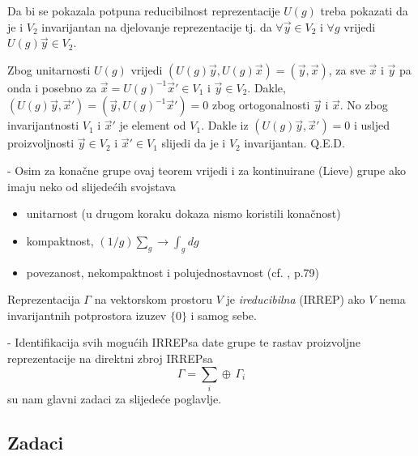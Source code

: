 Da bi se pokazala potpuna reducibilnost
reprezentacije $U(g)$ treba pokazati da  je i $V_2$ invarijantan na djelovanje
reprezentacije tj. da 
$\forall\vec{y} \in V_2$ i $\forall g$ vrijedi $U(g) \vec{y} \in V_2$.

Zbog unitarnosti $U(g)$ vrijedi $(U(g) \vec{y} , U(g)\vec{x}) = 
(\vec{y}, \vec{x})$,
za sve $\vec{x}$ i $\vec{y}$ pa onda i posebno za 
$\vec{x}=U(g)^{-1}\vec{x}'\in V_1$ i
$\vec{y} \in V_2$. Dakle, $(U(g)\vec{y}, \vec{x}')=(\vec{y}, U(g)^{-1}\vec{x}')
=0$ zbog ortogonalnosti $\vec{y}$ i $\vec{x}$.
No zbog invarijantnosti $V_1$ i $\vec{x}'$ je element od $V_1$. Dakle iz
$(U(g) \vec{y} , \vec{x}') = 0$ i usljed proizvoljnosti $\vec{y}\in V_2$
i $\vec{x}'\in V_1$ slijedi da je i $V_2$ invarijantan. Q.E.D.


- Osim za konačne grupe ovaj teorem vrijedi i za kontinuirane (Lieve) grupe
ako imaju neko od slijedećih svojstava
\begin{itemize}
\item unitarnost (u drugom koraku dokaza nismo koristili konačnost)
\item kompaktnost,  $(1/g)\sum_g \to \int_g dg$
\item povezanost, nekompaktnost i polujednostavnost (cf. \cite{Cornwell84}, p.79)
\end{itemize}


\begin{definicija}
Reprezentacija $\Gamma$ na vektorskom prostoru $V$ je
\emph{ireducibilna} (IRREP) ako $V$ nema invarijantnih potprostora
izuzev $\{0\}$ i samog sebe.
\end{definicija}


- Identifikacija svih mogućih IRREPsa date grupe te rastav
  proizvoljne reprezentacije na direktni zbroj IRREPsa
\begin{displaymath}
  \Gamma = \sum_{i} \oplus\, \Gamma_{i}
\end{displaymath}
  su nam glavni zadaci za slijedeće poglavlje.



\subsection*{Zadaci}

